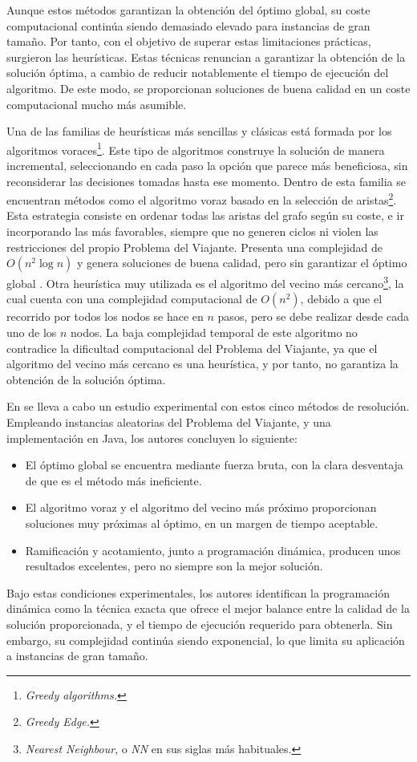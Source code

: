 Aunque estos métodos garantizan la obtención del óptimo global, su coste computacional continúa siendo 
demasiado elevado para instancias de gran tamaño. Por tanto, con el objetivo de superar estas limitaciones 
prácticas, surgieron las heurísticas. Estas técnicas renuncian a garantizar la obtención de la solución 
óptima, a cambio de reducir notablemente el tiempo de ejecución del algoritmo. De este modo, se 
proporcionan soluciones de buena calidad en un coste computacional mucho más asumible. 

Una de las familias de heurísticas más sencillas y clásicas está formada por los algoritmos 
voraces\footnote{\textit{Greedy algorithms.}}. Este tipo de algoritmos construye la solución de 
manera incremental, seleccionando en cada paso la opción que parece más beneficiosa, sin 
reconsiderar las decisiones tomadas hasta ese momento. Dentro de esta familia se encuentran métodos
como el algoritmo voraz basado en la selección de aristas\footnote{\textit{Greedy Edge.}}. Esta estrategia
consiste en ordenar todas las aristas del grafo según su coste, e ir incorporando las más favorables,
siempre que no generen ciclos ni violen las restricciones del propio Problema del Viajante. Presenta una
complejidad de $O(n^2 \log n)$ y genera soluciones de buena calidad, pero sin garantizar el óptimo global 
\cite{abdulkarim2015}. Otra heurística muy utilizada es el algoritmo del vecino más 
cercano\footnote{\textit{Nearest Neighbour}, o \textit{NN} en sus siglas más habituales.}, 
la cual cuenta con una complejidad computacional de $O(n^2)$, debido a que el 
recorrido por todos los nodos se hace en $n$ pasos, pero se debe realizar desde cada uno de los $n$ 
nodos. La baja complejidad temporal de este algoritmo no contradice la dificultad computacional del 
Problema del Viajante, ya que el algoritmo del vecino más cercano es una heurística, y por tanto, no
garantiza la obtención de la solución óptima. 

En \cite{baidoo2016} se lleva a cabo un estudio experimental con estos cinco métodos de resolución.
Empleando instancias aleatorias del Problema del Viajante, y una implementación en Java, los autores
concluyen lo siguiente:
\begin{itemize}
  \item El óptimo global se encuentra mediante fuerza bruta, con la clara desventaja de que es el método 
más ineficiente.
  \item El algoritmo voraz y el algoritmo del vecino más próximo proporcionan soluciones muy próximas al 
  óptimo, en un margen de tiempo aceptable.
  \item Ramificación y acotamiento, junto a programación dinámica, producen unos resultados excelentes, 
  pero no siempre son la mejor solución.
\end{itemize}
Bajo estas condiciones experimentales, los autores identifican la programación dinámica como la técnica
exacta que ofrece el mejor balance entre la calidad de la solución proporcionada, y el tiempo de ejecución
requerido para obtenerla. Sin embargo, su complejidad continúa siendo exponencial, lo que limita su 
aplicación a instancias de gran tamaño.

